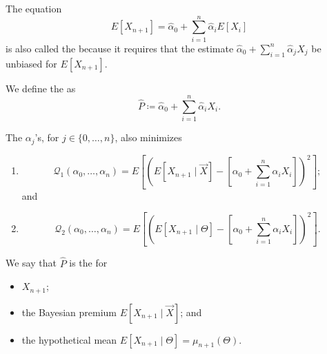 \documentclass[notoc,notitlepage]{tufte-book}
\begin{document}
\begin{note}
  The equation
  \begin{equation*}
    E[X_{n+1}] = \hat{\alpha}_0 + \sum_{i=1}^{n} \hat{\alpha}_i E[X_i]
  \end{equation*}
  is also called the  because it requires that the
  estimate $\hat{\alpha}_0 + \sum_{i=1}^{n} \hat{\alpha}_j X_j$ be unbiased for
  $E[X_{n+1}]$.
\end{note}

\begin{defn}\label{defn:estimator_for_the_credibility_premium}
  We define the  as
  \begin{equation*}
    \hat{P} \coloneqq \hat{\alpha}_0 + \sum_{i=1}^{n} \hat{\alpha}_i X_i.
  \end{equation*}
\end{defn}

\begin{crly}\label{crly:p_hat_as_best_linear_estimator}
  The $\alpha_j$'s, for $j \in \{0, \ldots, n\}$, also minimizes
  \begin{enumerate}
    \item 
      \begin{equation*}
        \mathcal{Q}_1(\alpha_0, \ldots, \alpha_n) = E \left[ \left( E[X_{n+1}
          \mid \vec{X}] - \left[\alpha_0 + \sum_{i=1}^{n} \alpha_i X_i\right]
          \right)^2 \right];
      \end{equation*}
      and
    \item 
      \begin{equation*}
        \mathcal{Q}_2(\alpha_0, \ldots, \alpha_n) = E \left[ \left( E[X_{n+1}
          \mid \Theta] - \left[ \alpha_0 + \sum_{i=1}^{n} \alpha_i X_i \right]
          \right)^2 \right].
      \end{equation*}
  \end{enumerate}

  We say that $\hat{P}$ is the  for
  \begin{itemize}
    \item $X_{n+1}$;
    \item the Bayesian premium $E[X_{n+1} \mid \vec{X}]$; and
    \item the hypothetical mean $E[X_{n+1} \mid \Theta] = \mu_{n+1}(\Theta)$.
  \end{itemize}
\end{crly}
\end{document}
